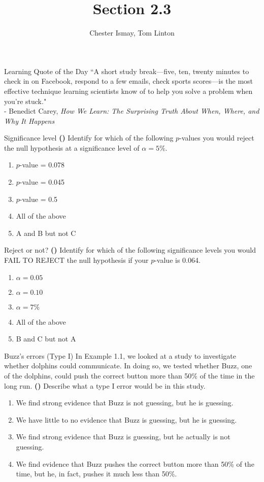 \documentclass[13pt]{beamer}
\title{Section 2.3}
\author{Chester Ismay, Tom Linton}
\institute{Ripon College, Central College}
\date{}
\newcounter{count}
\newcommand{\quotes}[2]{\centering \Large{``#1"\\
\vspace*{0.2in}
\hspace*{0.5in} - #2}}
\newcommand{\question}{ \textbf{(\decimal{count})} \stepcounter{count}}
\begin{document}
\begin{frame}
  \titlepage
\end{frame}


\begin{frame}{Learning Quote of the Day}
\quotes{A short study break—five, ten, twenty minutes to check in on Facebook, respond to a few emails, check sports scores—is the most effective technique learning scientists know of to help you solve a problem when you’re stuck.}{Benedict Carey, \textit{How We Learn: The Surprising Truth About When, Where, and Why It Happens}}
\end{frame}

\begin{frame}{Significance level}
	\question Identify for which of the following $p$-values you would reject the null hypothesis at a significance level of $\alpha = 5\%$.
\begin{enumerate}[A]
	\item $p$-value = 0.078
    \item $p$-value = 0.045
    \item $p$-value = 0.5
    \item All of the above
    \item A and B but not C
\end{enumerate}
\end{frame}

\begin{frame}{Reject or not?}
	\question Identify for which of the following significance levels you would FAIL TO REJECT the null hypothesis if your $p$-value is 0.064.
\begin{enumerate}[A]
	\item $\alpha = 0.05$
    \item $\alpha = 0.10$
    \item $\alpha = 7\%$
    \item All of the above
    \item B and C but not A
\end{enumerate}
\end{frame}

\begin{frame}{Buzz's errors (Type I)}
In Example 1.1, we looked at a study to investigate whether dolphins could communicate. In doing so, we tested whether Buzz, one of the dolphins, could push the correct button more
than 50\% of the time in the long run. \question Describe what a type I error would be in this study.
\begin{enumerate}[A]
	\item We find strong evidence that Buzz is not guessing, but he is guessing.
    \item We have little to no evidence that Buzz is guessing, but he is guessing.
    \item We find strong evidence that Buzz is guessing, but he actually is not guessing.
    \item We find evidence that Buzz pushes the correct button more than 50\% of the time, but he, in fact, pushes it much less than 50\%.
\end{enumerate}
\end{frame}
\end{document}
